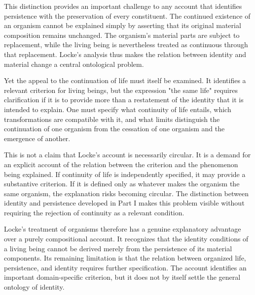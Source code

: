 This distinction provides an important challenge
to any account that identifies persistence with
the preservation of every constituent. The continued
existence of an organism cannot be explained simply
by asserting that its original material composition
remains unchanged. The organism's material parts
are subject to replacement, while the living being
is nevertheless treated as continuous through that
replacement. Locke's analysis thus makes the relation
between identity and material change a central
ontological problem.

\label{para:VS.B01.P01.C08.S08.SS05.P004}

Yet the appeal to the continuation of life must
itself be examined. It identifies a relevant
criterion for living beings, but the expression
"the same life" requires clarification if it is
to provide more than a restatement of the identity
that it is intended to explain. One must specify
what continuity of life entails, which transformations
are compatible with it, and what limits distinguish
the continuation of one organism from the cessation
of one organism and the emergence of another.

\label{para:VS.B01.P01.C08.S08.SS05.P005}

This is not a claim that Locke's account is necessarily
circular. It is a demand for an explicit account of
the relation between the criterion and the phenomenon
being explained. If continuity of life is independently
specified, it may provide a substantive criterion.
If it is defined only as whatever makes the organism
the same organism, the explanation risks becoming
circular. The distinction between identity and
persistence developed in Part I makes this problem
visible without requiring the rejection of continuity
as a relevant condition. 

\label{para:VS.B01.P01.C08.S08.SS05.P006}

Locke's treatment of organisms therefore has a
genuine explanatory advantage over a purely
compositional account. It recognizes that the identity
conditions of a living being cannot be derived merely
from the persistence of its material components.
Its remaining limitation is that the relation between
organized life, persistence, and identity requires
further specification. The account identifies an
important domain-specific criterion, but it does
not by itself settle the general ontology of identity.


